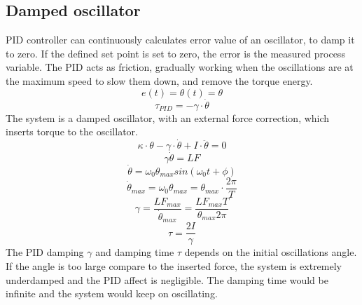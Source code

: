 \documentclass[\main/master.tex]{subfiles}
\begin{document}
\subsection{Damped oscillator}
PID controller can continuously calculates error value of an oscillator, to damp it to zero. If the defined set point is set to zero, the error is the measured process variable. The PID acts as friction, gradually working when the oscillations are at the maximum speed to slow them down, and remove the torque energy.
\begin{equation}
e(t) = \theta(t) = \theta   \label{eqn:error}
\end{equation}
\begin{equation}
\tau_{PID} = -\gamma\cdot\dot{\theta}   \label{eqn:friction_torque}
\end{equation}
The system is a damped oscillator, with an external force correction, which inserts torque to the oscillator.
\begin{equation}
\kappa\cdot\theta - \gamma\cdot\dot{\theta}  + I\cdot\ddot{\theta} = 0   \label{eqn:damped__pid_motion_equation}
\end{equation}
\begin{equation}
\gamma\dot{\theta}  = LF   \label{eqn:damped__pid_motion_equation}
\end{equation}
\begin{equation}
\dot{\theta} = \omega_0\theta_{max}sin(\omega_0 t +\phi)    \label{eqn:undamped_motion_equation}
\end{equation}
\begin{equation}
\dot{\theta}_{max} = \omega_0\theta_{max} = \theta_{max}\cdot\frac{2\pi}{T}    \label{eqn:undamped_motion_equation}
\end{equation}
\begin{equation}
\gamma  = \frac{LF_{max}}{\dot{\theta}_{max}} =\frac{LF_{max}T}{\theta_{max}2\pi}    \label{eqn:damped_pid_motion_equation}
\end{equation}
\begin{equation}
\tau =  \frac{2I}{\gamma}  \label{eqn:damping_time}
\end{equation}
The PID damping $\gamma$ and damping time $\tau$ depends on the initial oscillations angle. If the angle is too large compare to the inserted force, the system is extremely underdamped and the PID affect is negligible. The damping time would be infinite and the system would keep on oscillating.
\end{document}
